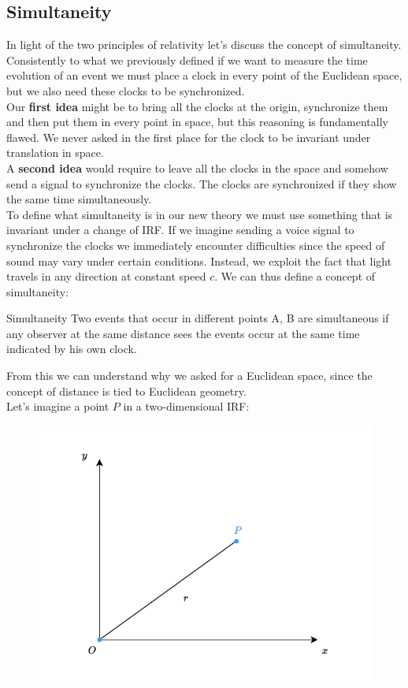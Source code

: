 \subsection{Simultaneity}
In light of the two principles of relativity let's discuss the concept of simultaneity. Consistently to what we previously defined if we want to measure the time evolution of an event we must place a clock in every point of the Euclidean space, but we also need these clocks to be synchronized.\\
Our \textbf{first idea} might be to bring all the clocks at the origin, synchronize them and then put them in every point in space, but this reasoning is fundamentally flawed. We never asked in the first place for the clock to be invariant under translation in space.\\
A \textbf{second idea} would require to leave all the clocks in the space and somehow send a signal to synchronize the clocks. The clocks are synchronized if they show the same time simultaneously.\\
To define what simultaneity is in our new theory we must use something that is invariant under a change of IRF. If we imagine sending a voice signal to synchronize the clocks we immediately encounter difficulties since the speed of sound may vary under certain conditions. Instead, we exploit the fact that light travels in any direction at constant speed $c$. We can thus define a concept of simultaneity:
\begin{definition}{Simultaneity}
  Two events that occur in different points A, B are simultaneous if any observer at the same distance sees the events occur at the same time indicated by his own clock.
\end{definition}
From this we can understand why we asked for a Euclidean space, since the concept of distance is tied to Euclidean geometry.\\
Let's imagine a point $P$ in a two-dimensional IRF:
\begin{figure}[H]
  \centering
  \includegraphics[width=0.6\linewidth]{res/svg/two_dim_IRF.drawio}
\end{figure}
